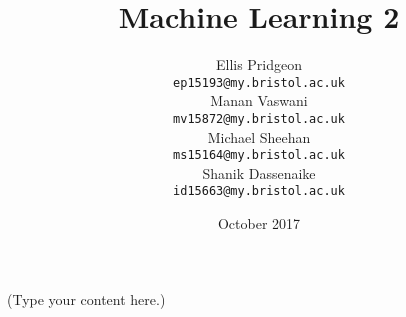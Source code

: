 \documentclass{article}
\date{October 2017}
\title{Machine Learning 2 }
\author{
Ellis Pridgeon \\
\texttt{ep15193@my.bristol.ac.uk} \\
\And
Manan Vaswani \\
\texttt{mv15872@my.bristol.ac.uk} \\
\AND
Michael Sheehan \\
\texttt{ms15164@my.bristol.ac.uk} \\
\And
Shanik Dassenaike \\
\texttt{id15663@my.bristol.ac.uk}
}
\begin{document}
\vspace*{-80pt}
\maketitle

(Type your content here.)
\end{document}
